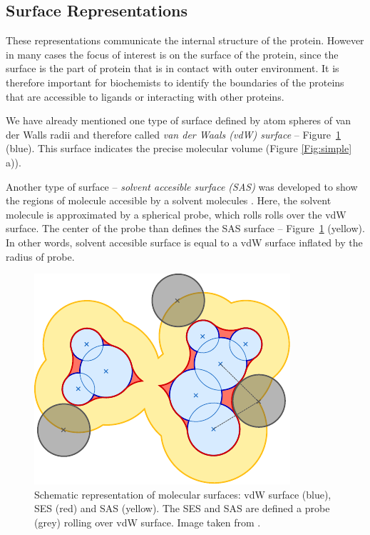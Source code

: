 \subsection{Surface Representations}
\label{Sec:surfaces}
These representations communicate the internal structure of the protein. However in many cases the focus of interest is on the surface of the protein, since the surface is the part of protein that is in contact with outer environment. It is therefore important for biochemists to identify the boundaries of the proteins that are accessible to ligands or interacting with other proteins.

We have already mentioned one type of surface defined by atom spheres of van der Walls radii and therefore called \textit{van der Waals (vdW) surface} \cite{richards1977areas} -- Figure~\ref{Fig:surface} (blue). This surface indicates the precise molecular volume (Figure \ref{Fig:simple} a)).

Another type of surface -- \textit{solvent accesible surface (SAS)} was developed to show the regions of molecule accesible by a solvent molecules \cite{lee1971interpretation}. Here, the solvent molecule is approximated by a spherical probe, which rolls rolls over the vdW surface. The center of the probe than defines the SAS surface -- Figure~\ref{Fig:surface} (yellow). In other words, solvent accesible surface is equal to a vdW surface inflated by the radius of probe.

\begin{figure} 
\vspace{-20pt}
\begin{center}
  \includegraphics[width=\linewidth]{pictures/surface.pdf} 
  \caption{Schematic representation of molecular surfaces: vdW surface (blue), SES (red) and SAS (yellow). The SES and SAS are defined a probe (grey) rolling over vdW surface. Image taken from \cite{kozlikova2015visualization}.}
  \label{Fig:surface}  
\end{center}
\vspace{-20pt}
\end{figure}

